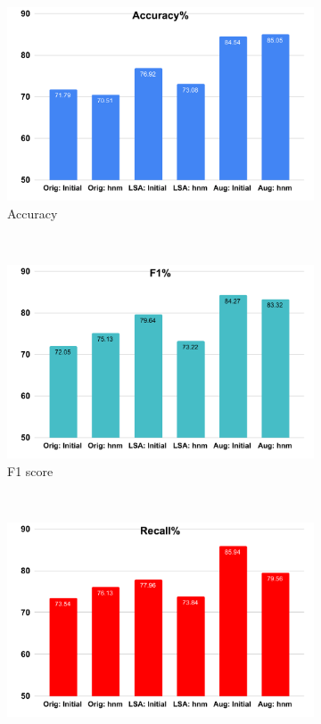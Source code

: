 \begin{figure}[!htb]
     \begin{subfigure}[b]{0.5\linewidth}
         \centering
          \includegraphics[scale=0.35]{Figs/chap4/vggacc.pdf}
          \caption{Accuracy}
     \end{subfigure}
     ~
     \begin{subfigure}[b]{0.5\linewidth}
         \centering
          \includegraphics[scale=0.35]{Figs/chap4/vggf.pdf}
          \caption{F1 score}
     \end{subfigure}
     \\
     \begin{subfigure}[b]{0.5\linewidth}
         \centering
          \includegraphics[scale=0.35]{Figs/chap4/vggrec.pdf}

\end{subfigure}
\end{figure}
